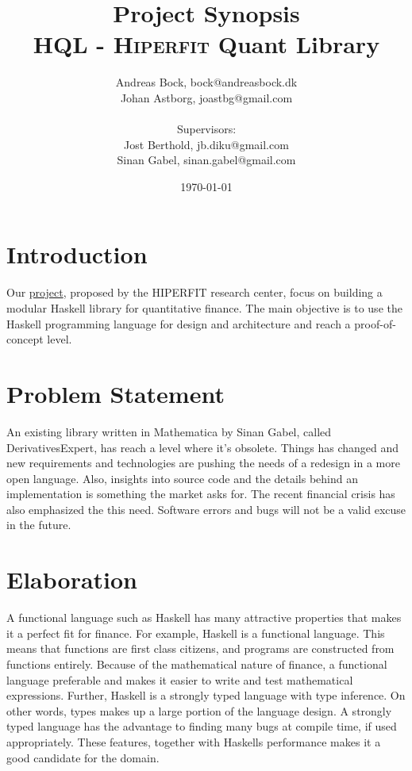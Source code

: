 \documentclass[11pt]{article}
\makeatletter
\def\Author{Andreas Bock, bock@andreasbock.dk\\
Johan Astborg, joastbg@gmail.com\\\\
Supervisors:\\
Jost Berthold, jb.diku@gmail.com\\
Sinan Gabel, sinan.gabel@gmail.com
}
\def\Title{\bf Project Synopsis\\ HQL - \textsc{Hiperfit} Quant Library}
\makeatother
\begin{document}
\title{\Title}
\author{\Author}
\date{\today}
\maketitle

\begin{abstract}


\end{abstract}

\section*{Introduction}
Our \href{http://hiperfit.dk/studentproject_haskell_library_finance.html}{project}, proposed by the HIPERFIT research center, 
focus on building a modular Haskell library for quantitative finance.
The main objective is to use the Haskell programming language for design and architecture and reach a proof-of-concept level.
\section*{Problem Statement}
An existing library written in Mathematica by Sinan Gabel, called DerivativesExpert, has reach a level where it's obsolete.
Things has changed and new requirements and technologies are pushing the needs of a redesign in a more open language.
Also, insights into source code and the details behind an implementation is something the market asks for. 
The recent financial crisis has also emphasized the this need. Software errors and bugs will not be a valid excuse in the future.
\section*{Elaboration}

A functional language such as Haskell has many attractive properties that
makes it a perfect fit for finance. For example, Haskell is a functional language.
This means that functions are first class citizens, and programs are constructed
from functions entirely. Because of the mathematical nature of finance, a functional
language preferable and makes it easier to write and test mathematical expressions.
Further, Haskell is a strongly typed language with type inference. On other words, 
types makes up a large portion of the language design. A strongly typed language has the
advantage to finding many bugs at compile time, if used appropriately. These features, together
with Haskells performance makes it a good candidate for the domain.\\
\end{document}
